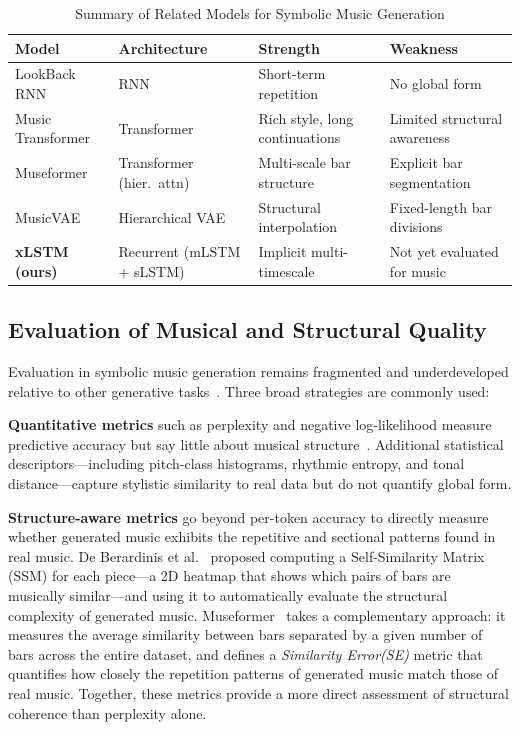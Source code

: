 \documentclass[conference]{IEEEtran}
\begin{document}
\begin{table}[t]
  \caption{Summary of Related Models for Symbolic Music Generation}
  \label{tab:related_work}
  \centering
  \renewcommand{\arraystretch}{1.2}
  \begin{tabular}{@{}p{1.7cm}p{1.5cm}p{1.7cm}p{1.7cm}@{}}
    \toprule
    \textbf{Model} & \textbf{Architecture} & \textbf{Strength} & \textbf{Weakness} \\
    \midrule
    LookBack RNN \cite{waite2016}
      & RNN
      & Short-term repetition
      & No global form \\
    Music Transformer \cite{huang2019}
      & Transformer
      & Rich style, long continuations
      & Limited structural awareness \\
    Museformer \cite{yu2022}
      & Transformer (hier.\ attn)
      & Multi-scale bar structure
      & Explicit bar segmentation \\
    MusicVAE \cite{roberts2018}
      & Hierarchical VAE
      & Structural interpolation
      & Fixed-length bar divisions \\
    \textbf{xLSTM (ours)}
      & Recurrent (mLSTM + sLSTM)
      & Implicit multi-timescale
      & Not yet evaluated for music \\
    \bottomrule
  \end{tabular}
\end{table}

\subsection{Evaluation of Musical and Structural Quality}
\label{ssec:eval_bg}

Evaluation in symbolic music generation remains fragmented and
underdeveloped relative to other generative tasks~\cite{ji2023}.
Three broad strategies are commonly used:

\textbf{Quantitative metrics} such as perplexity and negative
log-likelihood measure predictive accuracy but say little about musical
structure~\cite{mitra2025}. Additional statistical descriptors—including
pitch-class histograms, rhythmic entropy, and tonal distance—capture
stylistic similarity to real data but do not quantify global form.

\textbf{Structure-aware metrics} go beyond per-token accuracy to
directly measure whether generated music exhibits the repetitive and
sectional patterns found in real music. De Berardinis et al.~\cite{deberardinis2022} proposed computing a Self-Similarity Matrix (SSM) for each piece—a 2D heatmap that shows which pairs of bars are musically similar—and using it to automatically evaluate the structural complexity of generated music. Museformer~\cite{yu2022} takes a complementary approach: it measures the average similarity between bars separated by a given number of bars across the entire dataset, and defines a \emph{Similarity Error(SE)} metric that quantifies how closely the repetition patterns of generated music match those of real music. Together, these metrics provide a more direct assessment of structural coherence than
perplexity alone.
\end{document}
